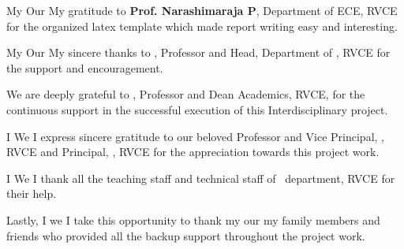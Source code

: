 \ifPG My \else \ifStuNameBUsed Our \else My \fi\fi gratitude to \textbf{Prof. Narashimaraja P}, Department of ECE, RVCE for the organized latex template which made report writing easy and interesting.\\ \par


\ifPG My \else \ifStuNameBUsed Our \else My \fi\fi sincere thanks to \textbf{\printHOD}, Professor and Head, Department of \ifIDP \printGuideDeptAInLF\else\printDepartmentLF\fi, RVCE for the support and encouragement.\\ \par

\ifIDP
We are deeply grateful to \textbf{\printDA}, Professor and Dean Academics, RVCE, for the continuous support in the successful execution of this Interdisciplinary project.
\\ \par
\fi
\ifPG I \else \ifStuNameBUsed We \else I \fi\fi express sincere gratitude to our beloved Professor and Vice Principal, \textbf{\printVicePrincipal}, RVCE and Principal, \textbf{\printPrincipal}, RVCE for the appreciation towards this project work.\\ \par

\ifIDP \else\ifPG I \else\ifStuNameBUsed We \else I \fi\fi thank all the teaching staff and technical staff of \ifIDP \printGuideDeptAInLF\else\printDepartmentLF\fi\, department, RVCE for their help.\\ \par \fi

Lastly, \ifPG I \else\ifStuNameBUsed we \else I \fi\fi take this opportunity to thank \ifPG my \else\ifStuNameBUsed our \else my \fi\fi family members and friends who provided all the backup support throughout the project work.\\ \par